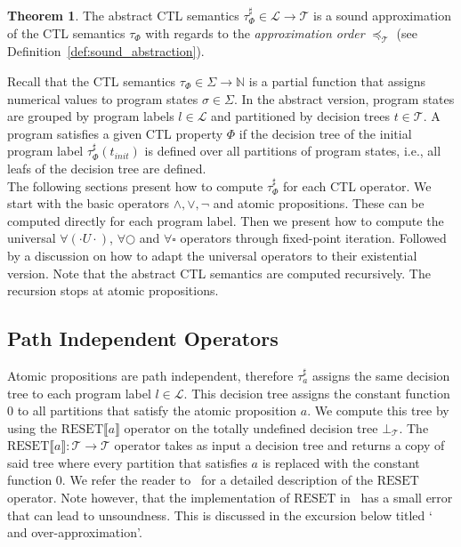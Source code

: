 \documentclass[11pt,a4paper,titlepage]{article}
\theoremstyle{definition}
\newtheorem{theorem}{Theorem}[section]
\begin{document}
\begin{theorem}\label{thr:abstract_ctl_semantics}
    The abstract CTL semantics $\tau^{\sharp}_\Phi \in \mathcal{L} \rightarrow \mathcal{T}$ is a sound approximation of the
    CTL semantics $\tau_\Phi$ with regards to the \textit{approximation order} $\preceq_\mathcal{T}$ (see Definition~\ref{def:sound_abstraction}).
\end{theorem}

Recall that the CTL semantics $\tau_\Phi \in \Sigma \rightarrow \mathbb{N}$ is a partial function that 
assigns numerical values to program states $\sigma \in \Sigma$. 
In the abstract version, program states are grouped by program labels $l \in \mathcal{L}$ and
partitioned by decision trees $t \in \mathcal{T}$. 
A program satisfies a given CTL property $\Phi$ if the decision tree of the
initial program label $\tau^{\sharp}_\Phi(t_{init})$ is defined over all partitions of program states, i.e., 
all leafs of the decision tree are defined.\\

The following sections present how to compute $\tau^{\sharp}_\Phi$ for each CTL operator. 
We start with the basic operators $\land, \lor, \neg$ and atomic propositions. 
These can be computed directly for each program label. 
Then we present how to compute the universal $\forall(\cdot U \cdot)$, $\forall\bigcirc$ and $\forall\square$ operators through fixed-point iteration. 
Followed by a discussion on how to adapt the universal operators to their existential version. 
Note that the abstract CTL semantics are computed recursively. The recursion stops at atomic propositions.

\subsection{Path Independent Operators}

Atomic propositions are path independent, therefore $\tau^{\sharp}_a$ assigns the same decision tree to 
each program label $l \in \mathcal{L}$. This decision tree assigns the constant function $0$ to all partitions that satisfy the atomic proposition $a$.
We compute this tree by using the $\text{RESET} \llbracket a \rrbracket$ operator on the totally undefined decision tree $\bot_\mathcal{T}$. 
The $\text{RESET}\llbracket a \rrbracket \colon \mathcal{T} \rightarrow \mathcal{T}$ operator takes as input a decision tree and returns a copy of 
said tree where every partition that satisfies $a$ is replaced with the constant function $0$. We refer the reader to~\cite{UrbanPhd}
for a detailed description of the $\text{RESET}$ operator. Note however, that the implementation of $\text{RESET}$ in~\cite{UrbanPhd} 
has a small error that can lead to unsoundness. This is discussed in the excursion below titled ` and over-approximation'.
\end{document}
